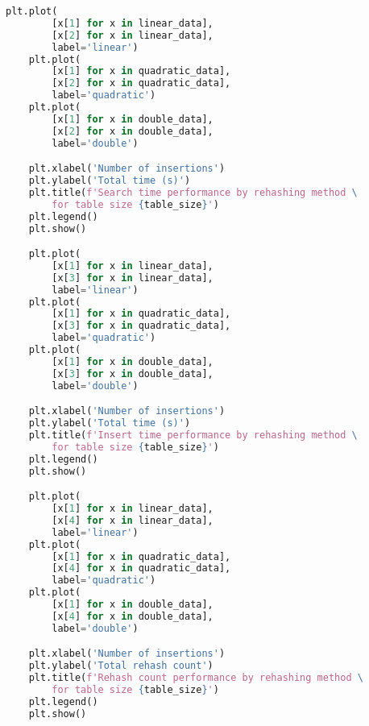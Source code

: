 \documentclass{article}
\begin{document}
\begin{lstlisting}[language=Python,label={lst:codesrc}]
        plt.plot(
        [x[1] for x in linear_data],
        [x[2] for x in linear_data],
        label='linear')
    plt.plot(
        [x[1] for x in quadratic_data],
        [x[2] for x in quadratic_data],
        label='quadratic')
    plt.plot(
        [x[1] for x in double_data],
        [x[2] for x in double_data],
        label='double')

    plt.xlabel('Number of insertions')
    plt.ylabel('Total time (s)')
    plt.title(f'Search time performance by rehashing method \
        for table size {table_size}')
    plt.legend()
    plt.show()

    plt.plot(
        [x[1] for x in linear_data],
        [x[3] for x in linear_data],
        label='linear')
    plt.plot(
        [x[1] for x in quadratic_data],
        [x[3] for x in quadratic_data],
        label='quadratic')
    plt.plot(
        [x[1] for x in double_data],
        [x[3] for x in double_data],
        label='double')

    plt.xlabel('Number of insertions')
    plt.ylabel('Total time (s)')
    plt.title(f'Insert time performance by rehashing method \
        for table size {table_size}')
    plt.legend()
    plt.show()

    plt.plot(
        [x[1] for x in linear_data],
        [x[4] for x in linear_data],
        label='linear')
    plt.plot(
        [x[1] for x in quadratic_data],
        [x[4] for x in quadratic_data],
        label='quadratic')
    plt.plot(
        [x[1] for x in double_data],
        [x[4] for x in double_data],
        label='double')

    plt.xlabel('Number of insertions')
    plt.ylabel('Total rehash count')
    plt.title(f'Rehash count performance by rehashing method \
        for table size {table_size}')
    plt.legend()
    plt.show()

\end{lstlisting}
\end{document}
